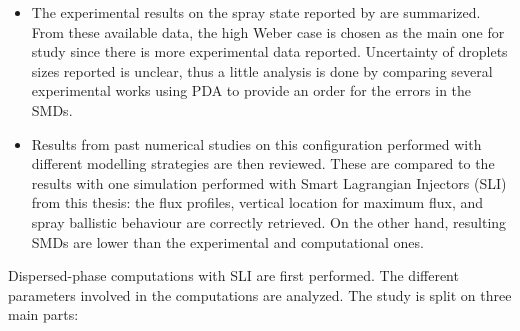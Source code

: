 \vspace*{-0.05in}

\begin{itemize}

	\item The experimental results on the spray state reported by  are summarized. From these available data, the high Weber case is chosen as the main one for study since there is more experimental data reported. Uncertainty of droplets sizes reported is unclear, thus a little analysis is done by comparing several experimental works using PDA to provide an order for the errors in the SMDs. 
	
	\vspace*{-0.05in}

	\item Results from past numerical studies on this configuration performed with different modelling strategies are then reviewed. These are compared to the results with one simulation performed with Smart Lagrangian Injectors (SLI) from this thesis: the flux profiles, vertical location for maximum flux, and spray ballistic behaviour are correctly retrieved. On the other hand, resulting SMDs are lower than the experimental and computational ones.

\end{itemize}

Dispersed-phase computations with SLI are first performed. The different parameters involved in the computations are analyzed. The study is split on three main parts:

